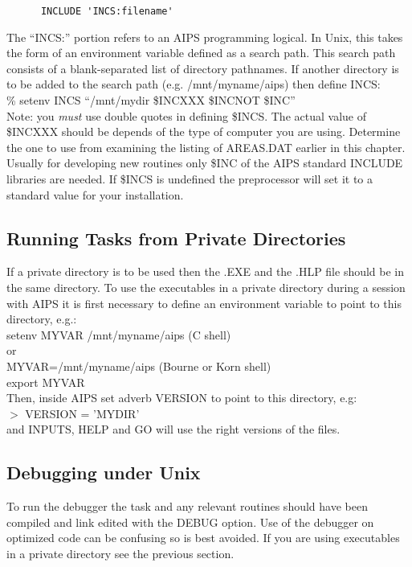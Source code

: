 \begin{verbatim}
      INCLUDE 'INCS:filename'

\end{verbatim}
The ``INCS:'' portion refers to an AIPS programming logical.  In Unix,
this takes the form of an environment variable defined as a search
path.  This search path consists of a blank-separated list of
directory pathnames.  If another directory is to be added to the
search path (e.g. /mnt/myname/aips) then define INCS:\\
\% setenv INCS ``/mnt/mydir \$INCXXX \$INCNOT \$INC''\\
Note: you {\it must} use double quotes in defining \$INCS.
The actual value of \$INCXXX should be depends of the type of computer
you are using.  Determine the one to use from examining the listing of
AREAS.DAT earlier in this chapter.  Usually for developing new
routines only \$INC of the AIPS standard INCLUDE libraries are needed.
If \$INCS is undefined the preprocessor will set it to a standard
value for your installation.

\subsection{Running Tasks from Private Directories}
If a private directory is to be used then the .EXE and the .HLP file
should be in the same directory.  To use the executables in a private
directory during a session with AIPS it is first necessary to define
an environment variable to point to this directory, e.g.:\\
setenv MYVAR /mnt/myname/aips   (C shell)\\
or\\
MYVAR=/mnt/myname/aips          (Bourne or Korn shell)\\
export MYVAR\\

Then, inside AIPS set adverb VERSION to point to this directory, e.g:\\
$>$ VERSION = 'MYDIR'\\
and INPUTS, HELP and GO will use the right versions of the files.

\subsection{Debugging under Unix}
To run the debugger the task and any relevant routines should have
been compiled and link edited with the DEBUG option.  Use of the
debugger on optimized code can be confusing so is best avoided.
If you are using executables in a private directory see the previous
section.

